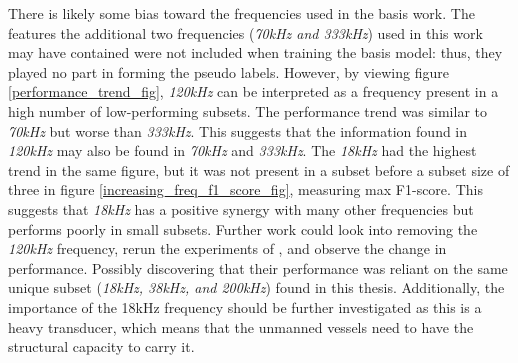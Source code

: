     
    
    
    
    
    
    
    
    There is likely some bias toward the frequencies used in the basis work. The features the additional two frequencies (\textit{70kHz and 333kHz}) used in this work may have contained were not included when training the basis model: thus, they played no part in forming the pseudo labels.  However, by viewing figure \ref{performance_trend_fig}, \textit{120kHz} can be interpreted as a frequency present in a high number of low-performing subsets. The performance trend was similar to \textit{70kHz} but worse than \textit{333kHz}. This suggests that the information found in \textit{120kHz} may also be found in \textit{70kHz} and \textit{333kHz}. The \textit{18kHz} had the highest trend in the same figure, but it was not present in a subset before a subset size of three in figure \ref{increasing_freq_f1_score_fig}, measuring max F1-score. This suggests that \textit{18kHz} has a positive synergy with many other frequencies but performs poorly in small subsets. Further work could look into removing the \textit{120kHz} frequency, rerun the experiments of \citeauthor{brautaset2020acoustic}, and observe the change in performance. Possibly discovering that their performance was reliant on the same unique subset (\textit{18kHz, 38kHz, and 200kHz}) found in this thesis. Additionally, the importance of the 18kHz frequency should be further investigated as this is a heavy transducer, which means that the unmanned vessels need to have the structural capacity to carry it.

